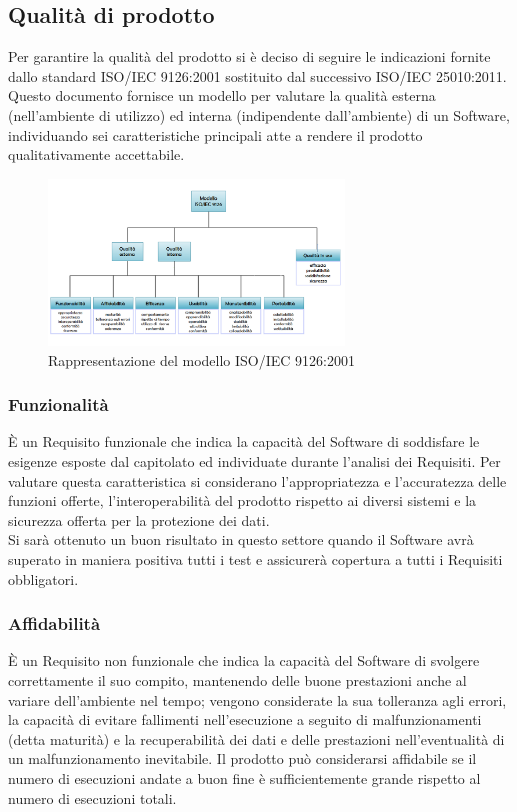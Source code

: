 \subsection{Qualità di prodotto}
Per garantire la qualità del prodotto si è deciso di seguire le indicazioni fornite dallo standard ISO/IEC 9126:2001 sostituito dal successivo ISO/IEC 25010:2011. Questo documento fornisce un modello per valutare la qualità esterna (nell’ambiente di utilizzo) ed interna (indipendente dall’ambiente) di un Software, individuando sei caratteristiche principali atte a rendere il prodotto qualitativamente accettabile.

\begin{figure}[h]
  \centering
    \includegraphics[width=0.7\textwidth]{./images/ISO-IEC_9126}
  \caption{Rappresentazione del modello ISO/IEC 9126:2001}
  \label{fig:ISO-IEC_9126}
\end{figure}


\subsubsection{Funzionalità}
È un Requisito funzionale che indica la capacità del Software di soddisfare le esigenze esposte dal capitolato ed individuate durante l’analisi dei Requisiti. Per valutare questa caratteristica si considerano l'appropriatezza e l'accuratezza delle funzioni offerte, l'interoperabilità del prodotto rispetto ai diversi sistemi e la sicurezza offerta per la protezione dei dati.\\ 
Si sarà ottenuto un buon risultato in questo settore quando il Software avrà superato in maniera positiva tutti i test e assicurerà copertura a tutti i Requisiti obbligatori.

\subsubsection{Affidabilità}
È un Requisito non funzionale che indica la capacità del Software di svolgere correttamente il suo compito, mantenendo delle buone prestazioni anche al variare dell'ambiente nel tempo; vengono considerate la sua tolleranza agli errori, la capacità di evitare fallimenti nell’esecuzione a seguito di malfunzionamenti (detta maturità) e la recuperabilità dei dati e delle prestazioni nell'eventualità di un malfunzionamento inevitabile. Il prodotto può considerarsi affidabile se il numero di esecuzioni andate a buon fine è sufficientemente grande rispetto al numero di esecuzioni totali.

